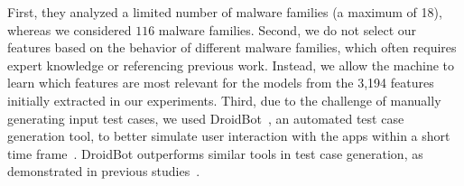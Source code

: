 First, they analyzed a limited number of malware families (a maximum of 18), whereas we considered $116$ malware families. Second, we do not select our features based on the behavior of different malware families, which often requires expert knowledge or referencing previous work. Instead, we allow the machine to learn which features are most relevant for the models from the 3,194 features initially extracted in our experiments. Third, due to the challenge of manually generating input test cases, we used DroidBot~\cite{DBLP:conf/icse/LiYGC17}, an automated test case generation tool, to better simulate user interaction with the apps within a short time frame~\cite{DBLP:conf/kbse/ChoudharyGO15}. DroidBot outperforms similar tools in test case generation, as demonstrated in previous studies~\cite{DBLP:conf/kbse/ChoudharyGO15,DBLP:journals/jss/CostaMMSSBNR22}.




